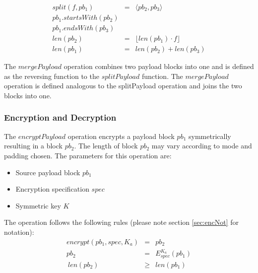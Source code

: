 \documentclass[10pt,journal,compsoc,twocolumn,twoside]{IEEEtran}
\begin{document}
\begin{eqnarray}
split(f, pb_1) & = &\langle pb_2, pb_3 \rangle\\
pb_1.startsWith(pb_2)\\
pb_1.endsWith(pb_3)\\
len(pb_2) & = & \lfloor len(pb_1)\cdot f\rfloor\\
len(pb_1) & = & len(pb_2) + len(pb_3)
\end{eqnarray}

The $mergePayload$ operation combines two payload blocks into one and is defined as the reversing function to the $splitPayload$ function. 
%
%
%
The $mergePayload$ operation is defined analogous to the splitPayload operation and joins the two blocks into one.
%

\subsubsection{Encryption and Decryption}
The $encryptPayload$ operation encrypts a payload block $pb_1$ symmetrically resulting in a block $pb_2$. The length of block $pb_2$ may vary according to mode and padding chosen. The parameters for this operation are:

\begin{itemize}
	\item Source payload block $pb_1$
	\item Encryption specification $spec$
	\item Symmetric key $K$
\end{itemize}

The operation follows the following rules (please note section \ref{sec:encNot} for notation):
\begin{eqnarray}
encrypt(pb_1, spec, K_a) & = & pb_2 \\
pb_2 & = & E_{spec}^{K_a}\left( pb_1 \right)\\\
len(pb_2) & \geq & len(pb_1)
\end{eqnarray}
\end{document}
